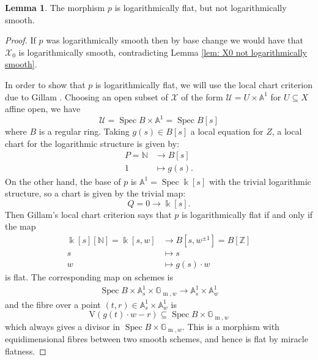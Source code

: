 \documentclass[11pt]{amsart}
\theoremstyle{definition}
\theoremstyle{definition}
\newtheorem{lemma}[theorem]{Lemma}
\newcommand{\op}[1]{\operatorname{#1}}
\newcommand{\Aaff}{\mathbb{A}}
\newcommand{\N}{\mathbb{N}}
\newcommand{\Z}{\mathbb{Z}}
\newcommand{\kfield}{\Bbbk}
\newcommand{\Xcal}{\mathcal{X}}
\newcommand{\Spec}{\operatorname{Spec}}
\begin{document}
\begin{lemma} \label{lemma p logarithmic flat} The morphism $p$ is logarithmically flat, but not logarithmically smooth.\end{lemma}
\begin{proof} If $p$ was logarithmically smooth then by base change we would have that $\Xcal_0$ is logarithmically smooth, contradicting Lemma \ref{lem: X0 not logarithmically smooth}.

In order to show that $p$ is logarithmically flat, we will use the local chart criterion due to Gillam \cite[\S 1.1]{GillamLogFlat}. Choosing an open subset of $\Xcal$ of the form $\mathcal{U}=U \times \Aaff^{\! 1}$ for $U\subseteq X$ affine open, we have
\begin{equation*} \mathcal{U} = \Spec B \times \Aaff^{\! 1} = \Spec B[s] \end{equation*}
where $B$ is a regular ring. Taking $g(s)\in B[s]$ a local equation for $Z$, a local chart for the logarithmic structure is given by:
\begin{align*} P = \N & \to B[s] \\
1 & \mapsto g(s).\end{align*}
On the other hand, the base of $p$ is $\Aaff^{\! 1} = \Spec \kfield[s]$ with the trivial logarithmic structure, so a chart is given by the trivial map:
\begin{equation*} Q = 0 \to \kfield[s]. \end{equation*}
Then Gillam's local chart criterion says that $p$ is logarithmically flat if and only if the map
\begin{align*} \kfield[s][\N] = \kfield[s,w] & \to B[s,w^{\pm 1}] = B[\Z] \\
s & \mapsto s \\
w & \mapsto g(s) \cdot w \end{align*}
is flat. The corresponding map on schemes is
\begin{align*} \Spec B \times \Aaff^{\! 1}_s \times \mathbb{G}_{\op{m},w} \to \Aaff^{\! 1}_s \times \Aaff^{\! 1}_w \end{align*}
and the fibre over a point $(t,r) \in \Aaff^{\! 1}_s \times \Aaff^{\! 1}_w$ is
\begin{equation*} \mathrm{V}( g(t)\cdot w - r )\subseteq \Spec B \times \mathbb{G}_{\op{m},w} \end{equation*}
which always gives a divisor in $\Spec B \times \mathbb{G}_{\op{m},w}$. This is a morphism with equidimensional fibres between two smooth schemes, and hence is flat by miracle flatness.\end{proof}
\end{document}
